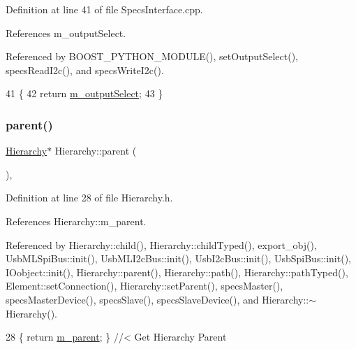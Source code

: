 Definition at line 41 of file Specs\+Interface.\+cpp.



References m\+\_\+output\+Select.



Referenced by B\+O\+O\+S\+T\+\_\+\+P\+Y\+T\+H\+O\+N\+\_\+\+M\+O\+D\+U\+L\+E(), set\+Output\+Select(), specs\+Read\+I2c(), and specs\+Write\+I2c().


\begin{DoxyCode}
41                                            \{
42     \textcolor{keywordflow}{return} \hyperlink{classSpecsInterface_a660cb4112ce1c071f277cb6ec115b411}{m\_outputSelect};
43 \}
\end{DoxyCode}
\mbox{\label{classHierarchy_a1c7bec8257e717f9c1465e06ebf845fc}} 
\subsubsection{\texorpdfstring{parent()}{parent()}\hspace{0.1cm}{\footnotesize\ttfamily [1/2]}}
{\footnotesize\ttfamily \hyperlink{classHierarchy}{Hierarchy}$\ast$ Hierarchy\+::parent (\begin{DoxyParamCaption}{ }\end{DoxyParamCaption})\hspace{0.3cm}{\ttfamily [inline]}, {\ttfamily [inherited]}}



Definition at line 28 of file Hierarchy.\+h.



References Hierarchy\+::m\+\_\+parent.



Referenced by Hierarchy\+::child(), Hierarchy\+::child\+Typed(), export\+\_\+obj(), Usb\+M\+L\+Spi\+Bus\+::init(), Usb\+M\+L\+I2c\+Bus\+::init(), Usb\+I2c\+Bus\+::init(), Usb\+Spi\+Bus\+::init(), I\+Oobject\+::init(), Hierarchy\+::parent(), Hierarchy\+::path(), Hierarchy\+::path\+Typed(), Element\+::set\+Connection(), Hierarchy\+::set\+Parent(), specs\+Master(), specs\+Master\+Device(), specs\+Slave(), specs\+Slave\+Device(), and Hierarchy\+::$\sim$\+Hierarchy().


\begin{DoxyCode}
28 \{ \textcolor{keywordflow}{return} \hyperlink{classHierarchy_a5814bb280d4e8539ab25ab6cbfb9cc4f}{m\_parent}; \}  \textcolor{comment}{//< Get Hierarchy Parent}
\end{DoxyCode}
\mbox{\label{classHierarchy_ad550588733bf75ac5c0fcfd7c8fd11a6}} 
